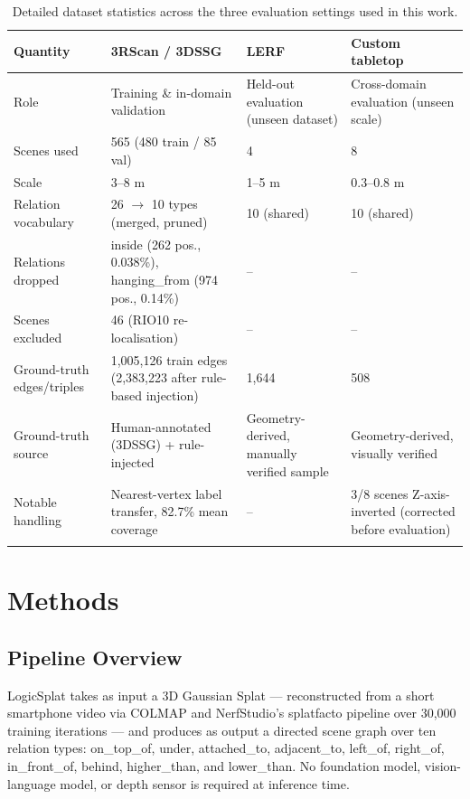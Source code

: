 \documentclass[sn-mathphys,Numbered]{sn-jnl}
\begin{document}
\begin{table}[htbp]
\centering
\caption{Detailed dataset statistics across the three evaluation settings used in this work.}\label{tab2}
\small
\begin{tabular}{@{}p{2.5cm}p{3.2cm}p{2.4cm}p{2.8cm}@{}}
\toprule
Quantity & 3RScan / 3DSSG & LERF & Custom tabletop \\
\midrule
Role & Training \& in-domain validation & Held-out evaluation (unseen dataset) & Cross-domain evaluation (unseen scale) \\
\midrule
Scenes used & 565 (480 train / 85 val) & 4 & 8 \\
\midrule
Scale & 3--8 m & 1--5 m & 0.3--0.8 m \\
\midrule
Relation vocabulary & 26 $\to$ 10 types (merged, pruned) & 10 (shared) & 10 (shared) \\
\midrule
Relations dropped & inside (262 pos., 0.038\%), hanging\_from (974 pos., 0.14\%) & -- & -- \\
\midrule
Scenes excluded & 46 (RIO10 re-localisation) & -- & -- \\
\midrule
Ground-truth edges/triples & 1,005,126 train edges (2,383,223 after rule-based injection) & 1,644 & 508 \\
\midrule
Ground-truth source & Human-annotated (3DSSG) + rule-injected & Geometry-derived, manually verified sample & Geometry-derived, visually verified \\
\midrule
Notable handling & Nearest-vertex label transfer, 82.7\% mean coverage & -- & 3/8 scenes Z-axis-inverted (corrected before evaluation) \\
\botrule
\end{tabular}
\end{table}

\FloatBarrier
\section{Methods}\label{sec4}

\FloatBarrier
\subsection{Pipeline Overview}\label{subsec4-1}

LogicSplat takes as input a 3D Gaussian Splat --- reconstructed from a short smartphone video via COLMAP and NerfStudio's splatfacto pipeline over 30,000 training iterations --- and produces as output a directed scene graph over ten relation types: on\_top\_of, under, attached\_to, adjacent\_to, left\_of, right\_of, in\_front\_of, behind, higher\_than, and lower\_than. No foundation model, vision-language model, or depth sensor is required at inference time.
\end{document}
